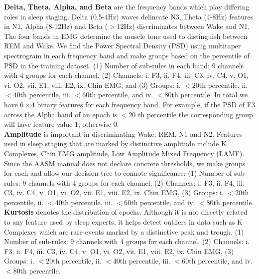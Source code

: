 \documentclass[pmlr]{jmlr}
\begin{document}
\noindent\textbf{Delta, Theta, Alpha, and Beta} are the frequency bands which play differing roles in sleep staging. Delta (0.5-4Hz) waves delineate N3, Theta (4-8Hz) features in N1, Alpha (8-12Hz) and Beta ($>$12Hz) discriminates between Wake and N1. The four bands in EMG determine the muscle tone used to distinguish between REM and Wake. We find the Power Spectral Density (PSD) using multitaper spectrogram \citep{mne1, mne2} in each frequency band and make groups based on the percentile of PSD in the training dataset. (1) Number of sub-rules in each band: 9 channels with 4 groups for each channel, (2) Channels: i. F3, ii. F4, iii. C3, iv. C4, v. O1, vi. O2, vii. E1, viii. E2, ix. Chin EMG, and (3) Groups: i. $<20$th percentile, ii. $<40$th percentile, iii. $<60$th percentile, and iv. $<80$th percentile. In total we have $6\times4$ binary features for each frequency band. For example, if the PSD of F3 across the Alpha band of an epoch is $<20$ th percentile the corresponding group will have feature value 1, otherwise 0.\\


\noindent\textbf{Amplitude} is important in discriminating Wake, REM, N1 and N2. Features used in sleep staging that are marked by distinctive amplitude include K Complexes, Chin EMG amplitude, Low Amplitude Mixed Frequency (LAMF). Since the AASM manual \citep{berry2012aasm} does not declare concrete thresholds, we make groups for each and allow our decision tree to connote significance: (1) Number of sub-rules: 9 channels with 4 groups for each channel, (2) Channels: i. F3, ii. F4, iii. C3, iv. C4, v. O1, vi. O2, vii. E1, viii. E2, ix. Chin EMG, (3) Groups: i. $<20$th percentile, ii. $<40$th percentile, iii. $<60$th percentile, and iv. $<80$th percentile.\\

\noindent\textbf{Kurtosis} denotes the distribution of epochs. Although it is not directly related to any feature used by sleep experts, it helps detect outliers in data such as K Complexes which are rare events marked by a distinctive peak and trough. (1) Number of sub-rules: 9 channels with 4 groups for each channel, (2) Channels: i. F3, ii. F4, iii. C3, iv. C4, v. O1, vi. O2, vii. E1, viii. E2, ix. Chin EMG, (3) Groups: i. $<20$th percentile, ii. $<40$th percentile, iii. $<60$th percentile, and iv. $<80$th percentile.
\end{document}
